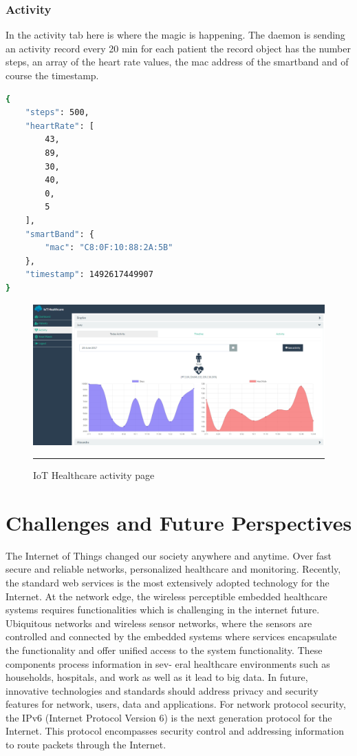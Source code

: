 \subsubsection{Activity}
In the activity tab here is where the magic is happening. The daemon is sending an activity record every 20 min for each patient the record object has the number steps, an array of the heart rate values, the mac address of the smartband and of course the timestamp. 
\newline

\begin{lstlisting}[language=Bash] 
{
	"steps": 500,
	"heartRate": [
		43,
		89,
		30,
		40,
		0,
		5
	],
	"smartBand": {
		"mac": "C8:0F:10:88:2A:5B"
	},
	"timestamp": 1492617449907   
}
\end{lstlisting}      

\begin{figure}[h!]
	\centering
	\includegraphics[width=1\textwidth]{./images/iothactivity}
	\rule{1\textwidth}{1pt}
	\caption{IoT Healthcare activity page}
\end{figure}

\section{Challenges and Future Perspectives}
The Internet of Things changed our society anywhere and anytime. Over fast secure
and reliable networks, personalized healthcare and monitoring. Recently, the
standard web services is the most extensively adopted technology for the Internet.
At the network edge, the wireless perceptible embedded healthcare systems requires
functionalities which is challenging in the internet future. Ubiquitous networks and
wireless sensor networks, where the sensors are controlled and connected by the
embedded systems where services encapsulate the functionality and offer unified
access to the system functionality. These components process information in sev-
eral healthcare environments such as households, hospitals, and work as well as it
lead to big data.
\newline
In future, innovative technologies and standards should address privacy and
security features for network, users, data and applications. For network protocol
security, the IPv6 (Internet Protocol Version 6) is the next generation protocol for
the Internet. This protocol encompasses security control and addressing information
to route packets through the Internet.
\newline


